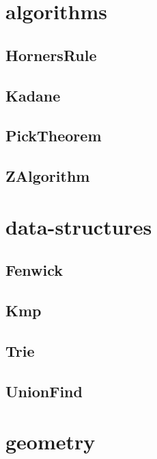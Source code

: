 \section{algorithms}
\subsection{ HornersRule}
\raggedbottom
\hrulefill
\subsection{ Kadane}
\raggedbottom
\hrulefill
\subsection{ PickTheorem}
\raggedbottom
\hrulefill
\subsection{ ZAlgorithm}
\raggedbottom
\hrulefill

\section{data-structures}
\subsection{ Fenwick}
\raggedbottom
\hrulefill
\subsection{ Kmp}
\raggedbottom
\hrulefill
\subsection{ Trie}
\raggedbottom
\hrulefill
\subsection{ UnionFind}
\raggedbottom
\hrulefill

\section{geometry}
